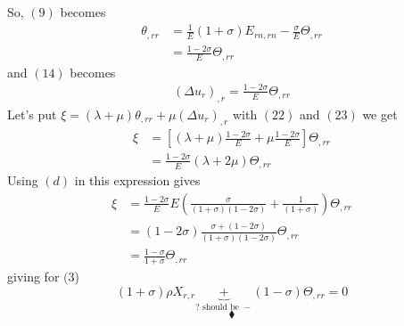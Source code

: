 So, $(9)$ becomes
\begin{align}
\theta_{,rr}&= \frac{1}{E}\left(1+\sigma\right)E_{rn,rn}- \frac{\sigma}{E} \Theta_{,rr} \\
&=\frac{1-2\sigma}{E}\Theta_{,rr} 
\end{align}
and  $(14)$ becomes
\begin{align}
\left(\Delta u_r\right)_{,r}=\frac{1-2\sigma}{E}\Theta_{,rr} 
\end{align}
Let's put $\xi= \left(\lambda+\mu\right)\theta_{,rr}+\mu\left(\Delta u_r\right)_{,r}$ with $(22)$ and $(23)$ we get
\begin{align}
\xi &= \left[\left(\lambda+\mu\right)\frac{1-2\sigma}{E}+\mu \frac{1-2\sigma}{E}\right]\Theta_{,rr} \\
&= \frac{1-2\sigma}{E}\left(\lambda+2\mu\right)\Theta_{,rr}
\end{align}
Using $(d)$ in this expression gives 
\begin{align}
\xi&= \frac{1-2\sigma}{E}E\left(\frac{\sigma}{\left(1+\sigma\right)\left(1-2\sigma\right)}+ \frac{1}{\left(1+\sigma\right)}\right)\Theta_{,rr}\\
&= \left(1-2\sigma\right)\frac{\sigma+\left(1-2\sigma\right)}{\left(1+\sigma\right)\left(1-2\sigma\right)}\Theta_{,rr}\\
&= \frac{1-\sigma}{1+\sigma}\Theta_{,rr}
\end{align}
giving for $(3$)
$$\left(1+\sigma\right)\rho X_{r,r} \underbrace{+}_{?\text{ should be } -}\left(1-\sigma \right)\Theta_{,rr}=0$$
$$\blacklozenge$$
\newpage




